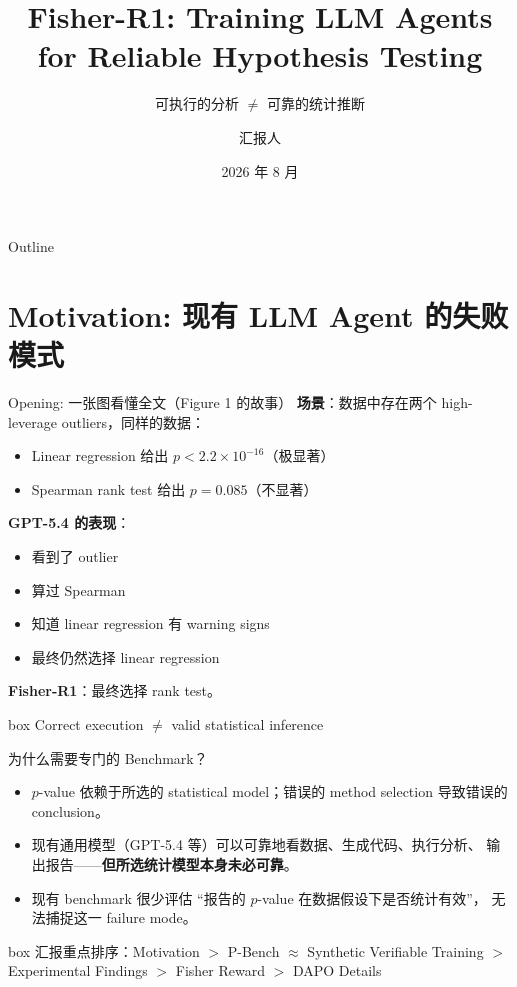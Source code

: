 \documentclass[aspectratio=169]{ctexbeamer}
\title[Fisher-R1 汇报]{Fisher-R1: Training LLM Agents\\for Reliable Hypothesis Testing}
\subtitle{可执行的分析 $\neq$ 可靠的统计推断}
\author{汇报人}
\date{2026 年 8 月}
\begin{document}
\begin{frame}
  \titlepage
\end{frame}

\begin{frame}{Outline}
  \tableofcontents
\end{frame}

\section{Motivation: 现有 LLM Agent 的失败模式}

\begin{frame}{Opening: 一张图看懂全文（Figure 1 的故事）}
  \textbf{场景}：数据中存在两个 \alert{high-leverage outliers}，同样的数据：
  \begin{itemize}
    \item Linear regression 给出 $p < 2.2\times 10^{-16}$（极显著）
    \item Spearman rank test 给出 $p = 0.085$（不显著）
  \end{itemize}

  \medskip
  \textbf{GPT-5.4 的表现}：
  \begin{itemize}
    \item 看到了 outlier
    \item 算过 Spearman
    \item 知道 linear regression 有 warning signs
    \item \alert{最终仍然选择 linear regression}
  \end{itemize}

  \medskip
  \textbf{Fisher-R1}：最终选择 rank test。

  \medskip
  \begin{beamercolorbox}[center, sep=8pt]{box}
    \Large Correct execution $\neq$ valid statistical inference
  \end{beamercolorbox}
\end{frame}

\begin{frame}{为什么需要专门的 Benchmark？}
  \begin{itemize}
    \item $p$-value 依赖于所选的 statistical model；错误的 method selection
          导致错误的 conclusion。
    \item 现有通用模型（GPT-5.4 等）可以可靠地看数据、生成代码、执行分析、
          输出报告——\textbf{但所选统计模型本身未必可靠}。
    \item 现有 benchmark 很少评估 ``报告的 $p$-value 在数据假设下是否统计有效''，
          无法捕捉这一 failure mode。
  \end{itemize}

  \medskip
  \begin{beamercolorbox}[center, sep=8pt]{box}
    汇报重点排序：Motivation $>$ P-Bench $\approx$ Synthetic Verifiable Training
    $>$ Experimental Findings $>$ Fisher Reward $>$ DAPO Details
  \end{beamercolorbox}
\end{frame}
\end{document}
